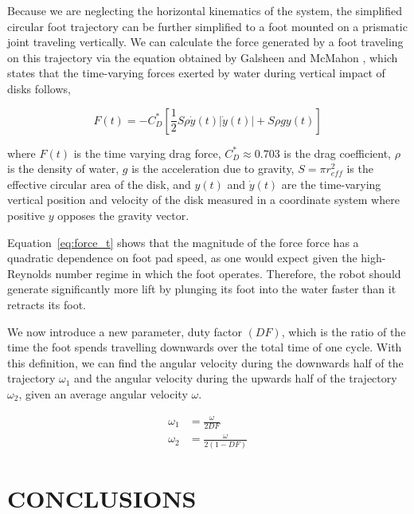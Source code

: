 \documentclass[letterpaper, 10 pt, conference]{ieeeconf}  %
\begin{document}
Because we are neglecting the horizontal kinematics of the system, the simplified circular foot trajectory can be further simplified to a foot mounted on a prismatic joint traveling vertically. We can calculate the force generated by a foot traveling on this trajectory via the equation obtained by Galsheen and McMahon \cite{glasheen1996vertical}, which states that the time-varying forces exerted by water during vertical impact of disks follows,

\begin{equation}
	F(t) = - C_D^* \left[\frac{1}{2} S \rho \dot{y}(t) |\dot{y}(t) | + S \rho g y(t) \right]
	\label{eq:force_t}
\end{equation}

\noindent where $F(t)$ is the time varying drag force, $C_D^* \approx 0.703$ is the drag coefficient, $\rho$ is the density of water, $g$ is the acceleration due to gravity, $S = \pi r_{eff}^2$ is the effective circular area of the disk, and $y(t)$ and $\dot{y}(t)$ are the time-varying vertical position and velocity of the disk measured in a coordinate system where positive $y$ opposes the gravity vector. 

Equation~\ref{eq:force_t} shows that the magnitude of the force force has a quadratic dependence on foot pad speed, as one would expect given the high-Reynolds number regime in which the foot operates. Therefore, the robot should generate significantly more lift by plunging its foot into the water faster than it retracts its foot.

We now introduce a new parameter, duty factor $(DF)$, which is the ratio of the time the foot spends travelling downwards over the total time of one cycle. With this definition, we can find the angular velocity during the downwards half of the trajectory $\omega_1$ and the angular velocity during the upwards half of the trajectory $\omega_2$, given an average angular velocity $\omega$.

\begin{align}
	\omega_1 &= \frac{\omega}{2 DF} \\
	\omega_2 &= \frac{\omega}{2 (1 - DF)}
\end{align}

\section{CONCLUSIONS}

\end{document}
